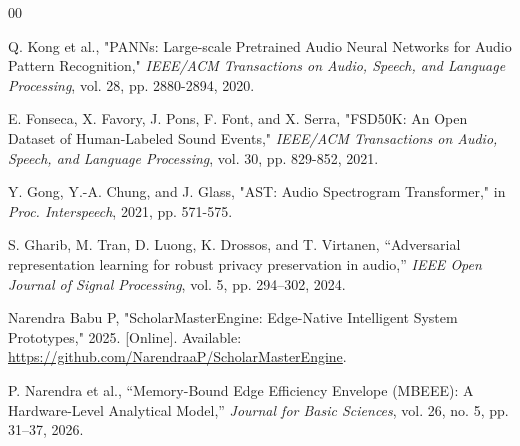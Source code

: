 \documentclass[conference]{IEEEtran}
\begin{document}
\begin{thebibliography}{00}

 Q. Kong et al., "PANNs: Large-scale Pretrained Audio Neural Networks for Audio Pattern Recognition," \textit{IEEE/ACM Transactions on Audio, Speech, and Language Processing}, vol. 28, pp. 2880-2894, 2020.

 E. Fonseca, X. Favory, J. Pons, F. Font, and X. Serra, "FSD50K: An Open Dataset of Human-Labeled Sound Events," \textit{IEEE/ACM Transactions on Audio, Speech, and Language Processing}, vol. 30, pp. 829-852, 2021.

 Y. Gong, Y.-A. Chung, and J. Glass, "AST: Audio Spectrogram Transformer," in \textit{Proc. Interspeech}, 2021, pp. 571-575.

 S. Gharib, M. Tran, D. Luong, K. Drossos, and T. Virtanen, ``Adversarial representation learning for robust privacy preservation in audio,'' \textit{IEEE Open Journal of Signal Processing}, vol. 5, pp. 294--302, 2024.

Narendra Babu P, "ScholarMasterEngine: Edge-Native Intelligent System Prototypes," 2025. [Online]. Available: \url{https://github.com/NarendraaP/ScholarMasterEngine}.

 P. Narendra et al., ``Memory-Bound Edge Efficiency Envelope (MBEEE): A Hardware-Level Analytical Model,'' \textit{Journal for Basic Sciences}, vol. 26, no. 5, pp. 31--37, 2026.


\end{thebibliography}
\end{document}
